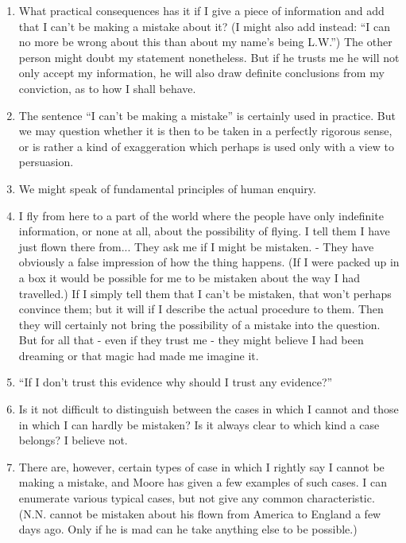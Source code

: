 \documentclass{book}
\begin{document}
\begin{enumerate}
\item
What practical consequences has it if I give a piece of information and add
that I can't be making a mistake about it?  (I might also add instead: ``I can
no more be wrong about this than about my name's being L.W.'') The other person
might doubt my statement nonetheless. But if he trusts me he will not only
accept my information, he will also draw definite conclusions from my
conviction, as to how I shall behave.

\item
The sentence ``I can't be making a mistake'' is certainly used in practice. But
we may question whether it is then to be taken in a perfectly rigorous sense,
or is rather a kind of exaggeration which perhaps is used only with a view to
persuasion.

\item
We might speak of fundamental principles of human enquiry.

\item
I fly from here to a part of the world where the people have only indefinite
information, or none at all, about the possibility of flying. I tell them I
have just flown there from... They ask me if I might be mistaken. - They have
obviously a false impression of how the thing happens. (If I were packed up in
a box it would be possible for me to be mistaken about the way I had
travelled.) If I simply tell them that I can't be mistaken, that won't perhaps
convince them; but it will if I describe the actual procedure to them. Then
they will certainly not bring the possibility of a mistake into the question.
But for all that - even if they trust me - they might believe I had been
dreaming or that magic had made me imagine it.

\item
``If I don't trust this evidence why should I trust any evidence?''

\item
Is it not difficult to distinguish between the cases in which I cannot and
those in which I can hardly be mistaken? Is it always clear to which kind a
case belongs? I believe not.

\item
There are, however, certain types of case in which I rightly say I cannot be
making a mistake, and Moore has given a few examples of such cases.  I can
enumerate various typical cases, but not give any common characteristic. (N.N.
cannot be mistaken about his flown from America to England a few days ago. Only
if he is mad can he take anything else to be possible.)


\end{enumerate}
\end{document}
